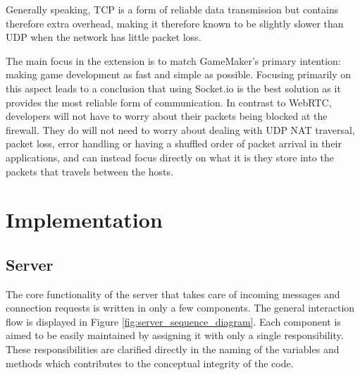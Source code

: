 \documentclass[bsc, 12pt, twoside, singlespacing, parskip, abbrevs, notimes, normalheadings, logo]{styles/infthesis}
\begin{document}
Generally speaking, TCP is a form of reliable data transmission but contains therefore extra overhead, making it therefore known to be slightly slower than UDP when the network has little packet loss.

The main focus in the extension is to match GameMaker's primary intention: making game development as fast and simple as possible. Focusing primarily on this aspect leads to a conclusion that using Socket.io is the best solution as it provides the most reliable form of communication. In contrast to WebRTC, developers will not have to worry about their packets being blocked at the firewall. They do will not need to worry about dealing with UDP NAT traversal, packet loss, error handling or having a shuffled order of packet arrival in their applications, and can instead focus directly on what it is they store into the packets that travels between the hosts.

\section{Implementation}
\subsection{Server}
The core functionality of the server that takes care of incoming messages and connection requests is written in only a few components. The general interaction flow is displayed in Figure \ref{fig:server_sequence_diagram}. Each component is aimed to be easily maintained by assigning it with only a single responsibility. These responsibilities are clarified directly in the naming of the variables and methods which contributes to the conceptual integrity of the code.
\end{document}
